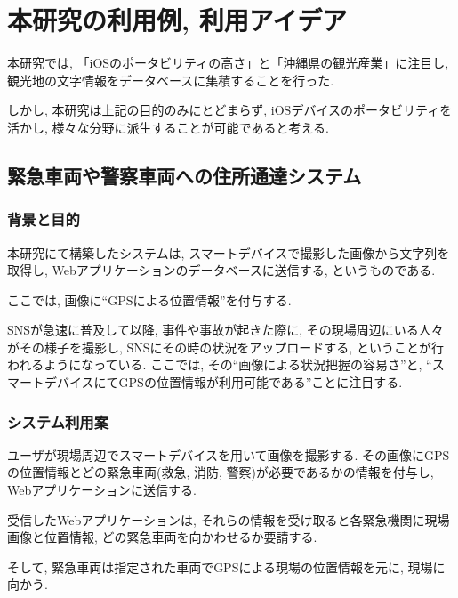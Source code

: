 \chapter{本研究の利用例, 利用アイデア}
\label{chap:utilization}

本研究では, 「iOSのポータビリティの高さ」と「沖縄県の観光産業」に注目し, 観光地の文字情報をデータベースに集積することを行った.

しかし, 本研究は上記の目的のみにとどまらず, iOSデバイスのポータビリティを活かし, 様々な分野に派生することが可能であると考える.

\section{緊急車両や警察車両への住所通達システム}
\subsection{背景と目的}
本研究にて構築したシステムは, スマートデバイスで撮影した画像から文字列を取得し, Webアプリケーションのデータベースに送信する, というものである.

ここでは, 画像に“GPSによる位置情報”を付与する.

SNSが急速に普及して以降, 事件や事故が起きた際に, その現場周辺にいる人々がその様子を撮影し, SNSにその時の状況をアップロードする, ということが行われるようになっている.
ここでは, その“画像による状況把握の容易さ”と, “スマートデバイスにてGPSの位置情報が利用可能である”ことに注目する.

\subsection{システム利用案}
ユーザが現場周辺でスマートデバイスを用いて画像を撮影する.
その画像にGPSの位置情報とどの緊急車両(救急, 消防, 警察)が必要であるかの情報を付与し, Webアプリケーションに送信する.

受信したWebアプリケーションは, それらの情報を受け取ると各緊急機関に現場画像と位置情報, どの緊急車両を向かわせるか要請する.

そして, 緊急車両は指定された車両でGPSによる現場の位置情報を元に, 現場に向かう.

